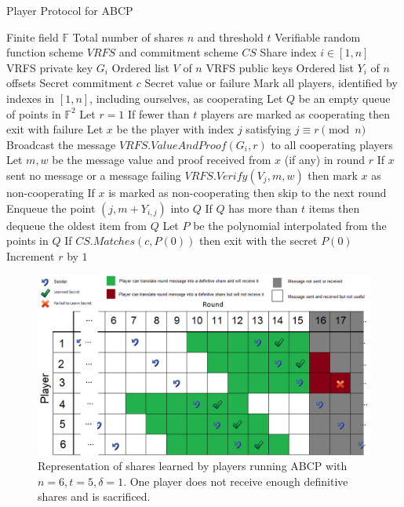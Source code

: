 \documentclass{dalcsthesis}
\begin{document}
\begin{algorithm}
  \caption{Player Protocol for ABCP}
  \label{alg:ABCP:Player}
  \begin{algorithmic}
    \INPUT Finite field $\mathbb{F}$
    \INPUT Total number of shares $n$ and threshold $t$
    \INPUT Verifiable random function scheme $VRFS$ and commitment scheme $CS$
    \INPUT Share index $i \in [1, n]$
    \INPUT VRFS private key $G_i$
    \INPUT Ordered list $V$ of $n$ VRFS public keys
    \INPUT Ordered list $Y_i$ of $n$ offsets
    \INPUT Secret commitment $c$
    \OUTPUT Secret value or failure
    \STATE Mark all players, identified by indexes in $[1,n]$, including ourselves, as cooperating
    \STATE Let $Q$ be an empty queue of points in $\mathbb{F}^2$
    \STATE Let $r = 1$
	  \STATE If fewer than $t$ players are marked as cooperating then exit with failure
	  \STATE Let $x$ be the player with index $j$ satisfying $j \equiv r \pmod{n}$
	  	 \STATE Broadcast the message $VRFS.ValueAndProof(G_i, r)$ to all cooperating players
	  \ENDIF
	  \STATE Let $m, w$ be the message value and proof received from $x$ (if any) in round $r$
	  \STATE If $x$ sent no message or a message failing $VRFS.Verify(V_j, m, w)$ then mark $x$ as non-cooperating
	  \STATE If $x$ is marked as non-cooperating then skip to the next round
	  \STATE Enqueue the point $(j, m + Y_{i,j})$ into $Q$
      \STATE If $Q$ has more than $t$ items then dequeue the oldest item from $Q$
	   	\STATE Let $P$ be the polynomial interpolated from the points in $Q$
	    \STATE If $CS.Matches(c, P(0))$ then exit with the secret $P(0)$
	  \ENDIF
      \STATE Increment $r$ by $1$
	\ENDWHILE
  \end{algorithmic}
\end{algorithm}
\begin{figure}
\includegraphics[width=\textwidth]{../../Graphics/AsyncVerifiedSecret_n6t5d1.png}
\caption{Representation of shares learned by players running ABCP with $n=6, t=5, \delta=1$. One player does not receive enough definitive shares and is sacrificed.}
\label{img:ex:ABCP}
\end{figure}
\end{document}
